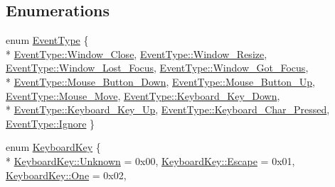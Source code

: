 \subsection*{Enumerations}
\begin{DoxyCompactItemize}
\item 
enum \hyperlink{namespaceZeta_a2417d0aa7e77bdc1e5a79bbb909680ec}{Event\+Type} \{ \\*
\hyperlink{namespaceZeta_a2417d0aa7e77bdc1e5a79bbb909680ecacb02966b66f68f7b403d365955b0b216}{Event\+Type\+::\+Window\+\_\+\+Close}, 
\hyperlink{namespaceZeta_a2417d0aa7e77bdc1e5a79bbb909680eca1553c9846eba4ca204fee2bbceba7736}{Event\+Type\+::\+Window\+\_\+\+Resize}, 
\hyperlink{namespaceZeta_a2417d0aa7e77bdc1e5a79bbb909680ecab314f4fa1d599c8ec3e67b4a1dfe3008}{Event\+Type\+::\+Window\+\_\+\+Lost\+\_\+\+Focus}, 
\hyperlink{namespaceZeta_a2417d0aa7e77bdc1e5a79bbb909680eca1bbcddc8f7e6dc0ff294bea6a9825510}{Event\+Type\+::\+Window\+\_\+\+Got\+\_\+\+Focus}, 
\\*
\hyperlink{namespaceZeta_a2417d0aa7e77bdc1e5a79bbb909680eca5505cefddbb74d62fbf030cae999bb5c}{Event\+Type\+::\+Mouse\+\_\+\+Button\+\_\+\+Down}, 
\hyperlink{namespaceZeta_a2417d0aa7e77bdc1e5a79bbb909680eca8a2e8bd56150fd686fd476433edc9957}{Event\+Type\+::\+Mouse\+\_\+\+Button\+\_\+\+Up}, 
\hyperlink{namespaceZeta_a2417d0aa7e77bdc1e5a79bbb909680eca05afa5af59ff16bf7616016092c3e0cb}{Event\+Type\+::\+Mouse\+\_\+\+Move}, 
\hyperlink{namespaceZeta_a2417d0aa7e77bdc1e5a79bbb909680ecace9e67cbb75554747b0638ede1b9af9c}{Event\+Type\+::\+Keyboard\+\_\+\+Key\+\_\+\+Down}, 
\\*
\hyperlink{namespaceZeta_a2417d0aa7e77bdc1e5a79bbb909680eca959ac1be4ff1a8be9300578fe7940982}{Event\+Type\+::\+Keyboard\+\_\+\+Key\+\_\+\+Up}, 
\hyperlink{namespaceZeta_a2417d0aa7e77bdc1e5a79bbb909680ecaf3fbfae5b504344329e9118f1c494d93}{Event\+Type\+::\+Keyboard\+\_\+\+Char\+\_\+\+Pressed}, 
\hyperlink{namespaceZeta_a2417d0aa7e77bdc1e5a79bbb909680ecafd038fc7f319e48f3115d92bf5bdbef9}{Event\+Type\+::\+Ignore}
 \}
\item 
enum \hyperlink{namespaceZeta_ad9d19d996b624b55871338b8ca7e629e}{Keyboard\+Key} \{ \\*
\hyperlink{namespaceZeta_ad9d19d996b624b55871338b8ca7e629ea88183b946cc5f0e8c96b2e66e1c74a7e}{Keyboard\+Key\+::\+Unknown} = 0x00, 
\hyperlink{namespaceZeta_ad9d19d996b624b55871338b8ca7e629ea013ec032d3460d4be4431c6ab1f8f224}{Keyboard\+Key\+::\+Escape} = 0x01, 
\hyperlink{namespaceZeta_ad9d19d996b624b55871338b8ca7e629ea06c2cea18679d64399783748fa367bdd}{Keyboard\+Key\+::\+One} = 0x02, 

\end{DoxyCompactItemize}
